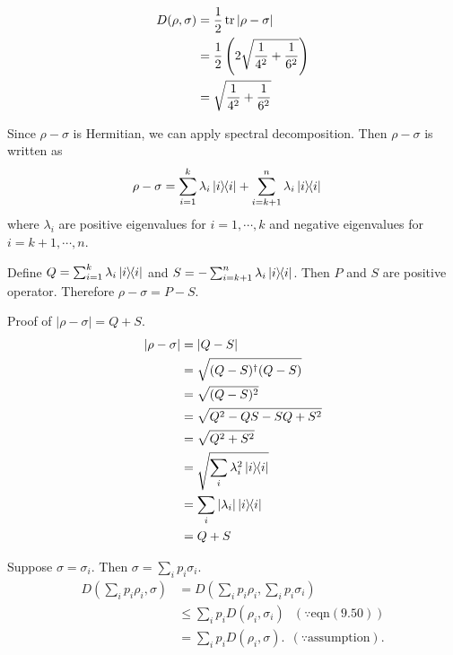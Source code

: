 \begin{align*}
	D(\rho, \sigma) &= \frac{1}{2} \operatorname{tr} |\rho - \sigma|\\
		&= \frac{1}{2}\left(2\sqrt{\frac{1}{4^2} + \frac{1}{6^2}}\right) \\
		&= \sqrt{\frac{1}{4^2} + \frac{1}{6^2}}
\end{align*}




Since $\rho - \sigma$ is Hermitian, we can apply spectral decomposition.
Then $\rho - \sigma$ is written as
\begin{align*}
	\rho - \sigma &= \sum_{i=1}^k \lambda_i \ket{i}\hspace{-1mm} \bra{i} + \sum_{i=k+1}^{n} \lambda_i \ket{i}\hspace{-1mm} \bra{i}
\end{align*}
where $\lambda_i$ are  positive eigenvalues for $i = 1, \cdots, k$ and negative eigenvalues for $i = k+1, \cdots, n$.

Define $Q = \sum_{i=1}^k \lambda_i \ket{i}\hspace{-1mm} \bra{i}$ and $S = -\sum_{i=k+1}^{n} \lambda_i \ket{i}\hspace{-1mm} \bra{i}$.
Then $P$ and $S$ are positive operator. Therefore $\rho - \sigma = P - S$.

\begin{screen}
	Proof of $|\rho - \sigma| = Q + S$.
	\begin{align*}
		|\rho- \sigma| &= |Q - S|\\
			&= \sqrt{(Q-S)^\dagger (Q-S)}\\
			&= \sqrt{(Q-S)^2}\\
			&= \sqrt{Q^2 - QS - SQ + S^2}\\
			&= \sqrt{Q^2 + S^2}\\
			&= \sqrt{\sum_i \lambda_i^2 \ket{i}\hspace{-1mm} \bra{i}}\\
			&= \sum_i |\lambda_i| \ket{i}\hspace{-1mm} \bra{i}\\
			&= Q + S
	\end{align*}
\end{screen}


Suppose $\sigma = \sigma_i$. Then $\sigma = \sum_i p_i \sigma_i$.
\begin{align}
	D \left( \sum_i p_i \rho_i, \sigma\right) &= D \left( \sum_i p_i \rho_i, \sum_i p_i \sigma_i\right)\\
		&\leq \sum_i p_i D(\rho_i, \sigma_i) ~~~ (\because \text{eqn}(9.50))\\
		&= \sum_i p_i D(\rho_i, \sigma).~~(\because \text{assumption}).
\end{align}



